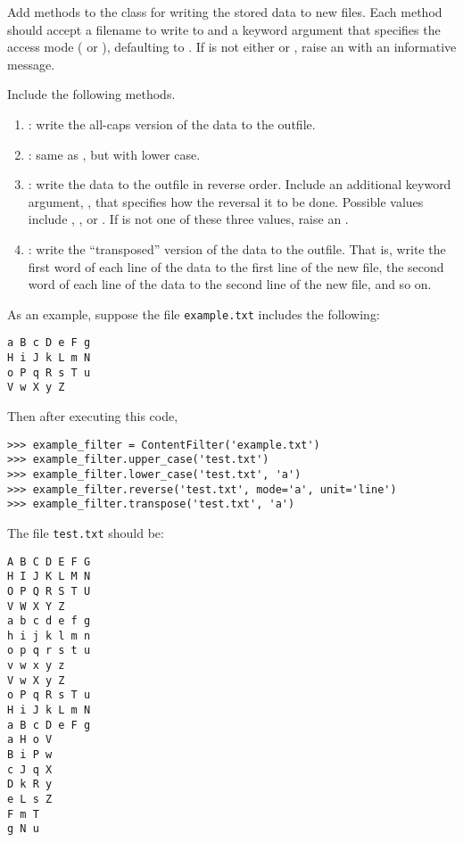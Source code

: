 \begin{problem}
Add methods to the  class for writing the stored data to new files.
Each method should accept a filename to write to and a keyword argument  that specifies the access mode ( or ), defaulting to .
If  is not either  or , raise an  with an informative message.

Include the following methods.
\begin{enumerate}
\item {}: write the all-caps version of the data to the outfile.
\item {}: same as , but with lower case.
\item {}: write the data to the outfile in reverse order. Include an additional keyword argument, , that specifies how the reversal it to be done. Possible values include , , or . If  is not one of these three values, raise an .

\item {}: write the ``transposed'' version of the data to the outfile. That is, write the first word of each line of the data to the first line of the new file, the second word of each line of the data to the second line of the new file, and so on. 
\end{enumerate}

As an example, suppose the file \texttt{example.txt} includes the following:
\begin{lstlisting}
a B c D e F g
H i J k L m N
o P q R s T u
V w X y Z
\end{lstlisting}

Then after executing this code,
\begin{lstlisting}
>>> example_filter = ContentFilter('example.txt')
>>> example_filter.upper_case('test.txt')
>>> example_filter.lower_case('test.txt', 'a')
>>> example_filter.reverse('test.txt', mode='a', unit='line')
>>> example_filter.transpose('test.txt', 'a')
\end{lstlisting}

The file \texttt{test.txt} should be:
\begin{lstlisting}
A B C D E F G
H I J K L M N
O P Q R S T U
V W X Y Z
a b c d e f g
h i j k l m n
o p q r s t u
v w x y z
V w X y Z
o P q R s T u
H i J k L m N
a B c D e F g
a H o V
B i P w
c J q X
D k R y
e L s Z
F m T
g N u
\end{lstlisting}
\end{problem}

